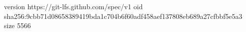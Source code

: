 version https://git-lfs.github.com/spec/v1
oid sha256:9cbb71d08658389419bda1c704b6f60adf458aef137808eb689a27cfbbf5e5a3
size 5566
